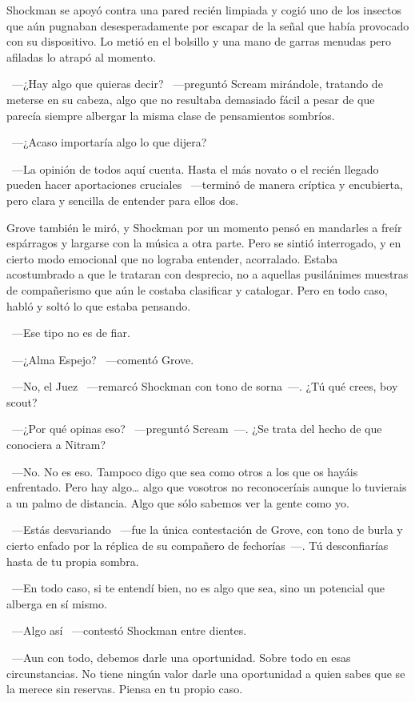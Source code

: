 Shockman se apoyó contra una pared recién limpiada y cogió uno de los insectos que aún pugnaban desesperadamente por escapar de la señal que había provocado con su dispositivo. Lo metió en el bolsillo y una mano de garras menudas pero afiladas lo atrapó al momento.

~---¿Hay algo que quieras decir? ~---preguntó Scream mirándole, tratando de meterse en su cabeza, algo que no resultaba demasiado fácil a pesar de que parecía siempre albergar la misma clase de pensamientos sombríos.

~---¿Acaso importaría algo lo que dijera?

~---La opinión de todos aquí cuenta. Hasta el más novato o el recién llegado pueden hacer aportaciones cruciales ~---terminó de manera críptica y encubierta, pero clara y sencilla de entender para ellos dos.

Grove también le miró, y Shockman por un momento pensó en mandarles a freír espárragos y largarse con la música a otra parte. Pero se sintió interrogado, y en cierto modo emocional que no lograba entender, acorralado. Estaba acostumbrado a que le trataran con desprecio, no a aquellas pusilánimes muestras de compañerismo que aún le costaba clasificar y catalogar. Pero en todo caso, habló y soltó lo que estaba pensando.

~---Ese tipo no es de fiar.

~---¿Alma Espejo? ~---comentó Grove.

~---No, el Juez ~---remarcó Shockman con tono de sorna~---. ¿Tú qué crees, boy scout?

~---¿Por qué opinas eso? ~---preguntó Scream~---. ¿Se trata del hecho de que conociera a Nitram?

~---No. No es eso. Tampoco digo que sea como otros a los que os hayáis enfrentado. Pero hay algo… algo que vosotros no reconoceríais aunque lo tuvierais a un palmo de distancia. Algo que sólo sabemos ver la gente como yo.

~---Estás desvariando ~---fue la única contestación de Grove, con tono de burla y cierto enfado por la réplica de su compañero de fechorías~---. Tú desconfiarías hasta de tu propia sombra.

~---En todo caso, si te entendí bien, no es algo que sea, sino un potencial que alberga en sí mismo.

~---Algo así ~---contestó Shockman entre dientes.

~---Aun con todo, debemos darle una oportunidad. Sobre todo en esas circunstancias. No tiene ningún valor darle una oportunidad a quien sabes que se la merece sin reservas. Piensa en tu propio caso.

